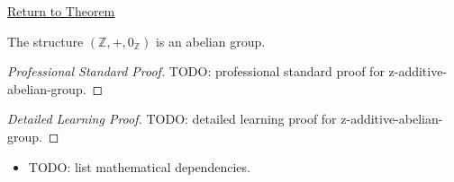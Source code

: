 \newpage
{}
\label{prf:z-additive-abelian-group}

\begin{remark*}[Return]
\hyperref[thm:z-additive-abelian-group]{Return to Theorem}
\end{remark*}

\begin{theorem*}
The structure $(\mathbb{Z},+,0_{\mathbb{Z}})$ is an abelian group.
\end{theorem*}

\begin{proof}[Professional Standard Proof]
\LRAProofBodyStart
TODO: professional standard proof for z-additive-abelian-group.
\end{proof}

\begin{proof}[Detailed Learning Proof]
\LRAProofBodyStart
TODO: detailed learning proof for z-additive-abelian-group.
\end{proof}

\begin{remark*}
\end{remark*}

\begin{dependencies}
\begin{itemize}
  \item TODO: list mathematical dependencies.
\end{itemize}
\end{dependencies}

\clearpage
